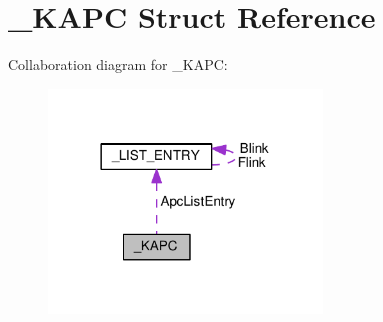 \hypertarget{struct__KAPC}{}\section{\+\_\+\+K\+A\+P\+C Struct Reference}
\label{struct__KAPC}


Collaboration diagram for \+\_\+\+K\+A\+P\+C\+:
\nopagebreak
\begin{figure}[H]
\begin{center}
\leavevmode
\includegraphics[width=206pt]{struct__KAPC__coll__graph}
\end{center}
\end{figure}
